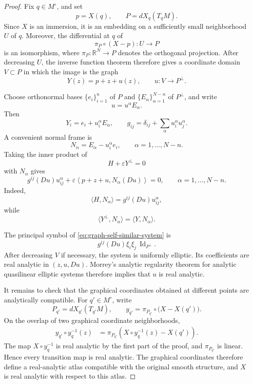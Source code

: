 \documentclass[11pt,a4paper]{article}
\numberwithin{equation}{section}
\begin{document}
\begin{proof}
Fix $q\in M^\circ$, and set
$$
        p=X(q),
        \qquad
        P=dX_q(T_qM).
$$
Since $X$ is an immersion, it is an embedding on a sufficiently small
neighborhood $U$ of $q$.  Moreover, the differential at $q$ of
$$
        \pi_P\circ(X-p):U\longrightarrow P
$$
is an isomorphism, where \(\pi_P:\mathbb R^N\to P\) denotes the
orthogonal projection.  After decreasing $U$, the inverse function theorem
therefore gives a coordinate domain $V\subset P$ in which the image is
the graph
$$
        Y(z)=p+z+u(z),
        \qquad
        u:V\longrightarrow P^\perp.
$$

Choose orthonormal bases $\{e_i\}_{i=1}^n$ of $P$ and
$\{E_\alpha\}_{\alpha=1}^{N-n}$ of $P^\perp$, and write
$$
        u=u^\alpha E_\alpha.
$$
Then
$$
        Y_i=e_i+u_i^\alpha E_\alpha,
        \qquad
        g_{ij}
        =\delta_{ij}+\sum_\alpha u_i^\alpha u_j^\alpha.
$$
A convenient normal frame is
$$
        N_\alpha
        =E_\alpha-u_i^\alpha e_i,
        \qquad
        \alpha=1,\ldots,N-n.
$$
Taking the inner product of
$$
        H+\varepsilon Y^\perp=0
$$
with $N_\alpha$ gives
\begin{equation}\label{eq:graph-self-similar-system}
        g^{ij}(Du)u_{ij}^\alpha
        +\varepsilon
        \left\langle p+z+u,N_\alpha(Du)\right\rangle
        =0,
        \qquad
        \alpha=1,\ldots,N-n.
\end{equation}
Indeed,
$$
        \langle H,N_\alpha\rangle
        =g^{ij}(Du)u_{ij}^\alpha,
$$
while
$$
        \langle Y^\perp,N_\alpha\rangle
        =\langle Y,N_\alpha\rangle.
$$

The principal symbol of \eqref{eq:graph-self-similar-system} is
$$
        g^{ij}(Du)\xi_i\xi_j\,
        \operatorname{Id}_{P^\perp}.
$$
After decreasing $V$ if necessary, the system is uniformly elliptic.
Its coefficients are real analytic in $(z,u,Du)$.  Morrey's analytic
regularity theorem for analytic quasilinear elliptic systems therefore
implies that $u$ is real analytic.

It remains to check that the graphical coordinates obtained at
different points are analytically compatible.  For $q'\in M^\circ$,
write
$$
        P_{q'}=dX_{q'}(T_{q'}M),
        \qquad
        y_{q'}=\pi_{P_{q'}}\circ\bigl(X-X(q')\bigr).
$$
On the overlap of two graphical coordinate neighborhoods,
$$
\begin{aligned}
        y_{q'}\circ y_q^{-1}(z)
        &=
        \pi_{P_{q'}}
        \left(
        X\circ y_q^{-1}(z)-X(q')
        \right).
\end{aligned}
$$
The map $X\circ y_q^{-1}$ is real analytic by the first part of the
proof, and $\pi_{P_{q'}}$ is linear.  Hence every transition map is
real analytic.  The graphical coordinates therefore define a
real-analytic atlas compatible with the original smooth structure, and
$X$ is real analytic with respect to this atlas.
\end{proof}
\end{document}
